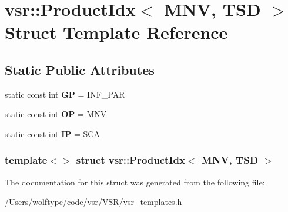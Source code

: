 \hypertarget{structvsr_1_1_product_idx_3_01_m_n_v_00_01_t_s_d_01_4}{\section{vsr\-:\-:Product\-Idx$<$ M\-N\-V, T\-S\-D $>$ Struct Template Reference}
\label{structvsr_1_1_product_idx_3_01_m_n_v_00_01_t_s_d_01_4}
}
\subsection*{Static Public Attributes}
\begin{DoxyCompactItemize}
\item 
\hypertarget{structvsr_1_1_product_idx_3_01_m_n_v_00_01_t_s_d_01_4_abc641bdf52aa7666108e65206ce72ca0}{static const int {\bfseries G\-P} = I\-N\-F\-\_\-\-P\-A\-R}\label{structvsr_1_1_product_idx_3_01_m_n_v_00_01_t_s_d_01_4_abc641bdf52aa7666108e65206ce72ca0}

\item 
\hypertarget{structvsr_1_1_product_idx_3_01_m_n_v_00_01_t_s_d_01_4_a18ffed28d2d3f69d32a290ef08cb95b5}{static const int {\bfseries O\-P} = M\-N\-V}\label{structvsr_1_1_product_idx_3_01_m_n_v_00_01_t_s_d_01_4_a18ffed28d2d3f69d32a290ef08cb95b5}

\item 
\hypertarget{structvsr_1_1_product_idx_3_01_m_n_v_00_01_t_s_d_01_4_a99a86f0a8aac548bded1a829522436bc}{static const int {\bfseries I\-P} = S\-C\-A}\label{structvsr_1_1_product_idx_3_01_m_n_v_00_01_t_s_d_01_4_a99a86f0a8aac548bded1a829522436bc}

\end{DoxyCompactItemize}
\subsubsection*{template$<$$>$ struct vsr\-::\-Product\-Idx$<$ M\-N\-V, T\-S\-D $>$}



The documentation for this struct was generated from the following file\-:\begin{DoxyCompactItemize}
\item 
/\-Users/wolftype/code/vsr/\-V\-S\-R/vsr\-\_\-templates.\-h\end{DoxyCompactItemize}
